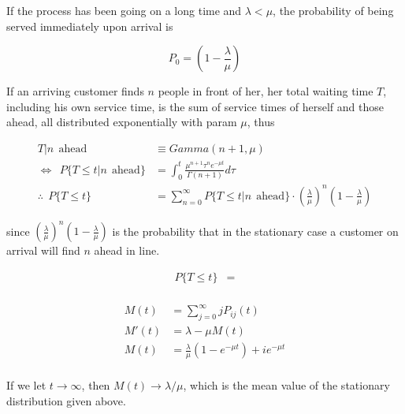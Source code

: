 \documentclass[12pt]{article}
\theoremstyle{nonumberbreak}
\begin{document}
If the process has been going on a long time and $\lambda < \mu$, the probability of being served immediately upon arrival is 

$$
P_0 = (1 - \frac{\lambda}{\mu})
$$


If an arriving customer finds $n$ people in front of her, her total waiting time $T$, including his own service time, is the sum of service times of herself and those ahead, all distributed exponentially with param $\mu$, thus 

$$
\begin{aligned}
T | n \ \ \mathrm{ahead} &\equiv Gamma(n+1, \mu) \\[8pt]
\Leftrightarrow \ \ P \{ T \le t | n \ \ \mathrm{ahead}  \} &= \int_0^t \frac{\mu^{n+1} \tau^n e^{-\mu t} }{\Gamma(n+1)} d\tau \\[10pt]
\therefore \ \ P \{ T \le t\} &= \sum_{n=0}^\infty P \{ T \le t | n \ \ \mathrm{ahead} \} \cdot (\frac{\lambda}{\mu})^n (1 - \frac{\lambda}{\mu})
\end{aligned}
$$  

since $(\frac{\lambda}{\mu})^n (1 - \frac{\lambda}{\mu})$ is the probability that in the stationary case a customer on arrival will find $n$ ahead in line. 


$$
\begin{aligned}
P \{ T \le t\} &= \\[8pt]
\end{aligned}
$$



$$
\begin{aligned}
M(t) &= \sum_{j=0}^\infty j P_{ij}(t) \\[8pt]
M'(t) &= \lambda - \mu M(t) \\[8pt]
M(t) &= \frac{\lambda}{\mu} (1 - e^{-\mu t}) + i e^{-\mu t} \\[8pt]
\end{aligned}
$$

If we let $t \to \infty$, then $M(t) \to \lambda/\mu$, which is the mean value of the stationary distribution given above. 
\end{document}
